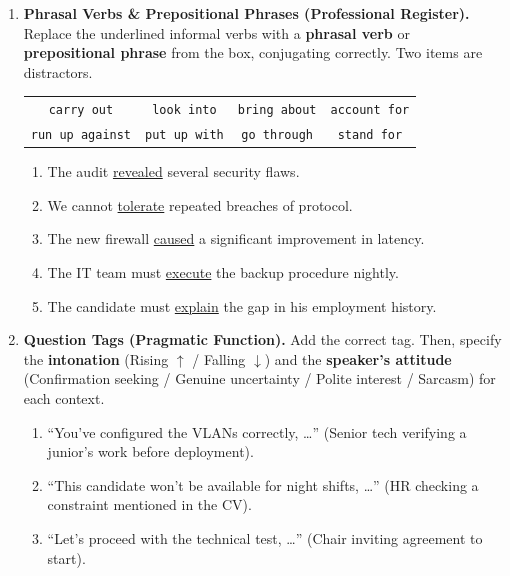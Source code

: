 \documentclass[11pt]{article}
\begin{document}
\begin{exercice}
\begin{enumerate}
    \item \textbf{Phrasal Verbs \& Prepositional Phrases (Professional Register).} 
    Replace the underlined informal verbs with a \textbf{phrasal verb} or \textbf{prepositional phrase} from the box, conjugating correctly. Two items are distractors.
    \begin{center}
    \begin{tabular}{cccc}
    \texttt{carry out} & \texttt{look into} & \texttt{bring about} & \texttt{account for} \\
    \texttt{run up against} & \texttt{put up with} & \texttt{go through} & \texttt{stand for}
    \end{tabular}
    \end{center}
    \begin{enumerate}
        \item The audit \underline{revealed} several security flaws.
        \item We cannot \underline{tolerate} repeated breaches of protocol.
        \item The new firewall \underline{caused} a significant improvement in latency.
        \item The IT team must \underline{execute} the backup procedure nightly.
        \item The candidate must \underline{explain} the gap in his employment history.
    \end{enumerate}
    \item \textbf{Question Tags (Pragmatic Function).} 
    Add the correct tag. Then, specify the \textbf{intonation} (Rising $\uparrow$ / Falling $\downarrow$) and the \textbf{speaker's attitude} (Confirmation seeking / Genuine uncertainty / Polite interest / Sarcasm) for each context.
    \begin{enumerate}
        \item ``You've configured the VLANs correctly, \dots'' (Senior tech verifying a junior's work before deployment).
        \item ``This candidate won't be available for night shifts, \dots'' (HR checking a constraint mentioned in the CV).
        \item ``Let's proceed with the technical test, \dots'' (Chair inviting agreement to start).
    \end{enumerate}
\end{enumerate}
\end{exercice}
\end{document}
